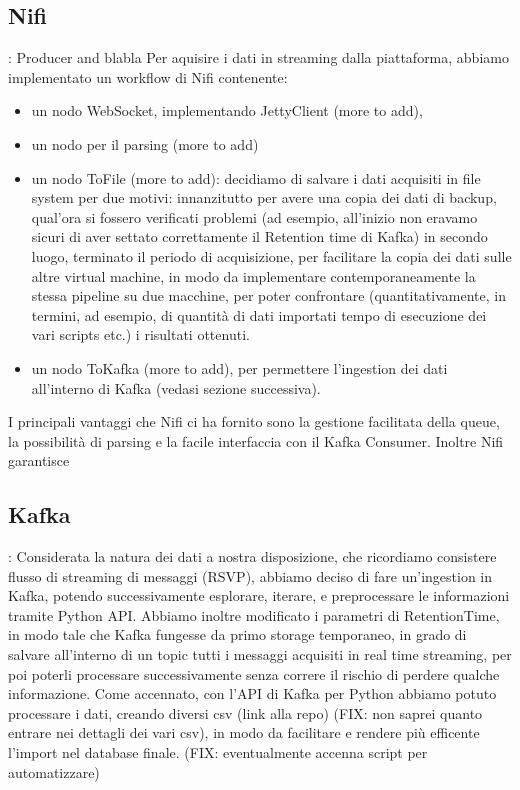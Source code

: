 \documentclass[fleqn,10pt]{SelfArx} %
\begin{document}
\subsection{Nifi}: Producer and blabla
Per aquisire i dati in streaming dalla piattaforma, abbiamo implementato un workflow di Nifi %
contenente: 
\begin{itemize}
\item un nodo WebSocket, implementando JettyClient (more to add), 
\item un nodo per il parsing (more to add)
\item un nodo ToFile (more to add): decidiamo di salvare i dati acquisiti in file system per due motivi: innanzitutto per avere una copia dei dati di backup, qual'ora si fossero verificati problemi (ad esempio, all'inizio non eravamo sicuri di aver settato correttamente il Retention time di Kafka) %
in secondo luogo, terminato il periodo di acquisizione, per facilitare la copia dei dati sulle altre virtual machine, in modo da implementare contemporaneamente la stessa pipeline su due macchine, per poter confrontare (quantitativamente, in termini, ad esempio, di quantità di dati importati tempo di esecuzione dei vari scripts etc.) i risultati ottenuti.
\item un nodo ToKafka (more to add), per permettere l'ingestion dei dati all'interno di Kafka (vedasi sezione successiva).
\end{itemize} 
I principali vantaggi che Nifi ci ha fornito sono la gestione facilitata della queue, la possibilità di parsing e la facile interfaccia con il Kafka Consumer. Inoltre Nifi garantisce %
\subsection{Kafka}: %
Considerata la natura dei dati a nostra disposizione, che ricordiamo consistere flusso di streaming di messaggi (RSVP), abbiamo deciso di fare un'ingestion in Kafka, potendo successivamente esplorare, iterare, e preprocessare le informazioni tramite Python API. Abbiamo inoltre modificato i parametri di RetentionTime, in modo tale che Kafka fungesse da primo storage temporaneo, in grado di salvare all'interno di un topic tutti i messaggi acquisiti in real time streaming, per poi poterli processare successivamente senza correre il rischio di perdere qualche informazione.
Come accennato, con l'API di Kafka per Python abbiamo potuto processare i dati, creando diversi csv (link alla repo) (FIX: non saprei quanto entrare nei dettagli dei vari csv), in modo da facilitare e rendere più efficente l'import nel database finale.
(FIX: eventualmente accenna script per automatizzare)
\end{document}
